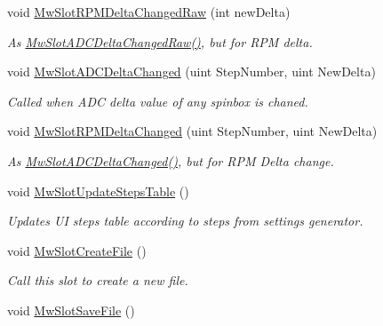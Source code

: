 \begin{DoxyCompactItemize}
void \hyperlink{class_main_window_a4480e7516f91b93c8abc3d42c1284124}{Mw\+Slot\+R\+P\+M\+Delta\+Changed\+Raw} (int new\+Delta)
\begin{DoxyCompactList}\small\item\em As \hyperlink{class_main_window_acbdfd3592779f6946c4fecc33c79e9a4}{Mw\+Slot\+A\+D\+C\+Delta\+Changed\+Raw()}, but for R\+PM delta. \end{DoxyCompactList}\item 
void \hyperlink{class_main_window_a5778840f76f8ce6edd63d84b57b801b1}{Mw\+Slot\+A\+D\+C\+Delta\+Changed} (uint Step\+Number, uint New\+Delta)
\begin{DoxyCompactList}\small\item\em Called when A\+DC delta value of any spinbox is chaned. \end{DoxyCompactList}\item 
void \hyperlink{class_main_window_a32b3a311b7151092db3ec0756d2c22d4}{Mw\+Slot\+R\+P\+M\+Delta\+Changed} (uint Step\+Number, uint New\+Delta)
\begin{DoxyCompactList}\small\item\em As \hyperlink{class_main_window_a5778840f76f8ce6edd63d84b57b801b1}{Mw\+Slot\+A\+D\+C\+Delta\+Changed()}, but for R\+PM Delta change. \end{DoxyCompactList}\item 
\mbox{\label{class_main_window_a07c8e8c9d91588bdcc8e1eae01c4ffd7}} 
void \hyperlink{class_main_window_a07c8e8c9d91588bdcc8e1eae01c4ffd7}{Mw\+Slot\+Update\+Steps\+Table} ()
\begin{DoxyCompactList}\small\item\em Updates UI steps table according to steps from settings generator. \end{DoxyCompactList}\item 
\mbox{\label{class_main_window_ab2bca26ed91446c16caebf7a93ae1334}} 
void \hyperlink{class_main_window_ab2bca26ed91446c16caebf7a93ae1334}{Mw\+Slot\+Create\+File} ()
\begin{DoxyCompactList}\small\item\em Call this slot to create a new file. \end{DoxyCompactList}\item 
\mbox{\label{class_main_window_a198ce62c26c57d653b0ac9f94eac87a4}} 
void \hyperlink{class_main_window_a198ce62c26c57d653b0ac9f94eac87a4}{Mw\+Slot\+Save\+File} ()

\end{DoxyCompactItemize}
